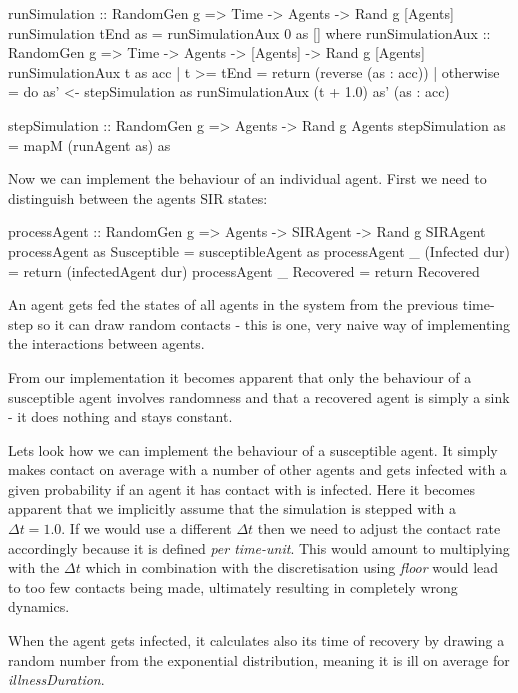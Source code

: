 \begin{HaskellCode}
runSimulation :: RandomGen g => Time -> Agents -> Rand g [Agents]
runSimulation tEnd as = runSimulationAux 0 as []
  where
    runSimulationAux :: RandomGen g 
      => Time -> Agents -> [Agents] -> Rand g [Agents]
    runSimulationAux t as acc
      | t >= tEnd = return (reverse (as : acc))
      | otherwise = do
        as' <- stepSimulation as 
        runSimulationAux (t + 1.0) as' (as : acc)

stepSimulation :: RandomGen g => Agents -> Rand g Agents
stepSimulation as = mapM (runAgent as) as
\end{HaskellCode}

Now we can implement the behaviour of an individual agent. First we need to distinguish between the agents SIR states:

\begin{HaskellCode}
processAgent :: RandomGen g => Agents -> SIRAgent -> Rand g SIRAgent
processAgent as Susceptible    = susceptibleAgent as
processAgent _  (Infected dur) = return (infectedAgent dur)
processAgent _  Recovered      = return Recovered
\end{HaskellCode}

An agent gets fed the states of all agents in the system from the previous time-step so it can draw random contacts - this is one, very naive way of implementing the interactions between agents.

From our implementation it becomes apparent that only the behaviour of a susceptible agent involves randomness and that a recovered agent is simply a sink - it does nothing and stays constant.

Lets look how we can implement the behaviour of a susceptible agent. It simply makes contact on average with a number of other agents and gets infected with a given probability if an agent it has contact with is infected. Here it becomes apparent that we implicitly assume that the simulation is stepped with a $\Delta t = 1.0$. If we would use a different $\Delta t$ then we need to adjust the contact rate accordingly because it is defined \textit{per time-unit}. This would amount to multiplying with the $\Delta t$ which in combination with the discretisation using \textit{floor} would lead to too few contacts being made, ultimately resulting in completely wrong dynamics.

When the agent gets infected, it calculates also its time of recovery by drawing a random number from the exponential distribution, meaning it is ill on average for \textit{illnessDuration}.

